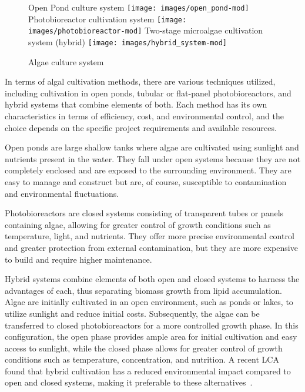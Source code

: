 \begin{figure}[H]
\centering
	\subcaptionbox%
		{Open Pond culture system\label{subfig:open_pond}}%
		{\texttt{[image: images/open\_pond-mod]}}%
\hspace*{\trehbtwsfig}%
	\subcaptionbox%
		{Photobioreactor cultivation system\label{subfig:photobioreactor}}%
		{\texttt{[image: images/photobioreactor-mod]}}%
\hspace*{\trehbtwsfig}%
	\subcaptionbox%
		{Two-stage microalgae cultivation system (hybrid)\label{subfig:hybrid_system}}%
		{\texttt{[image: images/hybrid\_system-mod]}}%
\caption%
{Algae culture system}
\label{fig:algae_culture_system}
\end{figure}


In terms of algal cultivation methods, there are various techniques utilized, including cultivation in open ponds, tubular or flat-panel photobioreactors, and hybrid systems that combine elements of both. Each method has its own characteristics in terms of efficiency, cost, and environmental control, and the choice depends on the specific project requirements and available resources.

Open ponds are large shallow tanks where algae are cultivated using sunlight and nutrients present in the water. They fall under open systems because they are not completely enclosed and are exposed to the surrounding environment. They are easy to manage and construct but are, of course, susceptible to contamination and environmental fluctuations.

Photobioreactors  are closed systems consisting of transparent tubes or panels containing algae, allowing for greater control of growth conditions such as temperature, light, and nutrients. They offer more precise environmental control and greater protection from external contamination, but they are more expensive to build and require higher maintenance.

Hybrid systems  combine elements of both open and closed systems to harness the advantages of each, thus separating biomass growth from lipid accumulation. Algae are initially cultivated in an open environment, such as ponds or lakes, to utilize sunlight and reduce initial costs. Subsequently, the algae can be transferred to closed photobioreactors for a more controlled growth phase. In this configuration, the open phase provides ample area for initial cultivation and easy access to sunlight, while the closed phase allows for greater control of growth conditions such as temperature,  concentration, and nutrition. A recent LCA found that hybrid cultivation has a reduced environmental impact compared to open and closed systems, making it preferable to these alternatives~\parencite{narala_Comparison_2016}.


